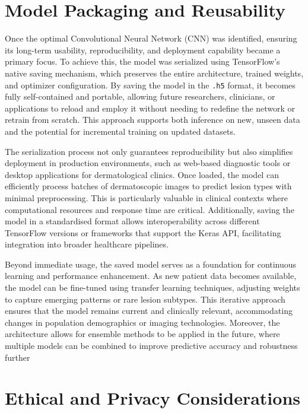 \documentclass[conference]{IEEEtran}
\begin{document}
\section{Model Packaging and Reusability} 

Once the optimal Convolutional Neural Network (CNN) was identified, ensuring its long-term usability, reproducibility, and deployment capability became a primary focus. To achieve this, the model was serialized using TensorFlow’s native saving mechanism, which preserves the entire architecture, trained weights, and optimizer configuration. By saving the model in the \texttt{.h5} format, it becomes fully self-contained and portable, allowing future researchers, clinicians, or applications to reload and employ it without needing to redefine the network or retrain from scratch. This approach supports both inference on new, unseen data and the potential for incremental training on updated datasets.

The serialization process not only guarantees reproducibility but also simplifies deployment in production environments, such as web-based diagnostic tools or desktop applications for dermatological clinics. Once loaded, the model can efficiently process batches of dermatoscopic images to predict lesion types with minimal preprocessing. This is particularly valuable in clinical contexts where computational resources and response time are critical. Additionally, saving the model in a standardised format allows interoperability across different TensorFlow versions or frameworks that support the Keras API, facilitating integration into broader healthcare pipelines.

Beyond immediate usage, the saved model serves as a foundation for continuous learning and performance enhancement. As new patient data becomes available, the model can be fine-tuned using transfer learning techniques, adjusting weights to capture emerging patterns or rare lesion subtypes. This iterative approach ensures that the model remains current and clinically relevant, accommodating changes in population demographics or imaging technologies. Moreover, the architecture allows for ensemble methods to be applied in the future, where multiple models can be combined to improve predictive accuracy and robustness further

	\section{Ethical and Privacy Considerations}
	
\end{document}
